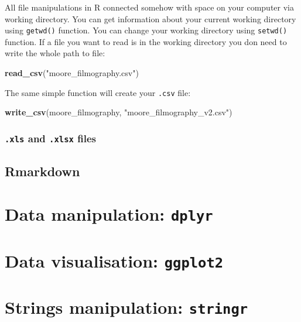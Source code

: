 \documentclass[
]{book}
\newenvironment{Shaded}{\begin{snugshade}}{\end{snugshade}}
\newcommand{\KeywordTok}[1]{\textcolor[rgb]{0.13,0.29,0.53}{\textbf{#1}}}
\newcommand{\NormalTok}[1]{#1}
\newcommand{\StringTok}[1]{\textcolor[rgb]{0.31,0.60,0.02}{#1}}
\begin{document}
All file manipulations in R connected somehow with space on your computer via working directory. You can get information about your current working directory using \texttt{getwd()} function. You can change your working directory using \texttt{setwd()} function. If a file you want to read is in the working directory you don need to write the whole path to file:

\begin{Shaded}
\begin{Highlighting}[]
\KeywordTok{read_csv}\NormalTok{(}\StringTok{"moore_filmography.csv"}\NormalTok{)}
\end{Highlighting}
\end{Shaded}

The same simple function will create your \texttt{.csv} file:

\begin{Shaded}
\begin{Highlighting}[]
\KeywordTok{write_csv}\NormalTok{(moore_filmography, }\StringTok{"moore_filmography_v2.csv"}\NormalTok{)}
\end{Highlighting}
\end{Shaded}

\hypertarget{xls-and-.xlsx-files}{%
\subsection{\texorpdfstring{\texttt{.xls} and \texttt{.xlsx} files}{.xls and .xlsx files}}\label{xls-and-.xlsx-files}}

\hypertarget{rmarkdown}{%
\section{Rmarkdown}\label{rmarkdown}}

\hypertarget{dplyr}{%
\chapter{\texorpdfstring{Data manipulation: \texttt{dplyr}}{Data manipulation: dplyr}}\label{dplyr}}

\hypertarget{ggplot2}{%
\chapter{\texorpdfstring{Data visualisation: \texttt{ggplot2}}{Data visualisation: ggplot2}}\label{ggplot2}}

\hypertarget{stringr}{%
\chapter{\texorpdfstring{Strings manipulation: \texttt{stringr}}{Strings manipulation: stringr}}\label{stringr}}
\end{document}
